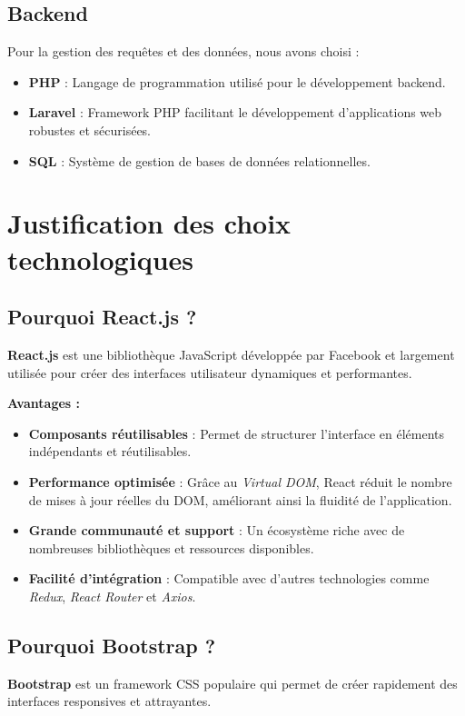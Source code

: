 \documentclass[a4paper,12pt]{article}
\begin{document}
\subsection{Backend}
Pour la gestion des requêtes et des données, nous avons choisi :

\begin{itemize}
    \item \textbf{PHP} : Langage de programmation utilisé pour le développement backend.
    \item \textbf{Laravel} : Framework PHP facilitant le développement d’applications web robustes et sécurisées.
    \item \textbf{SQL} : Système de gestion de bases de données relationnelles.
\end{itemize}

\section{Justification des choix technologiques}
\subsection{Pourquoi React.js ?}
\textbf{React.js} est une bibliothèque JavaScript développée par Facebook et largement utilisée pour créer des interfaces utilisateur dynamiques et performantes.

\textbf{Avantages :}
\begin{itemize}
    \item \textbf{Composants réutilisables} : Permet de structurer l’interface en éléments indépendants et réutilisables.
    \item \textbf{Performance optimisée} : Grâce au \textit{Virtual DOM}, React réduit le nombre de mises à jour réelles du DOM, améliorant ainsi la fluidité de l’application.
    \item \textbf{Grande communauté et support} : Un écosystème riche avec de nombreuses bibliothèques et ressources disponibles.
    \item \textbf{Facilité d’intégration} : Compatible avec d’autres technologies comme \textit{Redux}, \textit{React Router} et \textit{Axios}.
\end{itemize}

\subsection{Pourquoi Bootstrap ?}
\textbf{Bootstrap} est un framework CSS populaire qui permet de créer rapidement des interfaces responsives et attrayantes.
\end{document}
